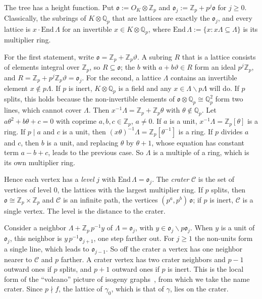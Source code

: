 \documentclass[11pt]{amsart}
\numberwithin{equation}{section}
\theoremstyle{plain}
\theoremstyle{definition}
\theoremstyle{remark}
\begin{document}
The tree has a height function. Put \(\mathfrak o:=O_K\otimes\mathbb Z_p\) and \(\mathfrak o_j:=\mathbb Z_p+p^j\mathfrak o\) for \(j\ge0\). Classically, the subrings of \(K\otimes\mathbb Q_p\) that are lattices are exactly the \(\mathfrak o_j\), and every lattice is \(x\cdot\mathrm{End}\,\Lambda\) for an invertible \(x\in K\otimes\mathbb Q_p\), where \(\mathrm{End}\,\Lambda:=\{x:x\Lambda\subseteq\Lambda\}\) is its multiplier ring.

For the first statement, write \(\mathfrak o=\mathbb Z_p+\mathbb Z_p\vartheta\). A subring \(R\) that is a lattice consists of elements integral over \(\mathbb Z_p\), so \(R\subseteq\mathfrak o\); the \(b\) with \(a+b\vartheta\in R\) form an ideal \(p^j\mathbb Z_p\), and \(R=\mathbb Z_p+p^j\mathbb Z_p\vartheta=\mathfrak o_j\). For the second, a lattice \(\Lambda\) contains an invertible element \(x\notin p\Lambda\). If \(p\) is inert, \(K\otimes\mathbb Q_p\) is a field and any \(x\in\Lambda\smallsetminus p\Lambda\) will do. If \(p\) splits, this holds because the non-invertible elements of \(\mathfrak o\otimes\mathbb Q_p\cong\mathbb Q_p^2\) form two lines, which cannot cover \(\Lambda\). Then \(x^{-1}\Lambda=\mathbb Z_p+\mathbb Z_p\theta\) with \(\theta\notin\mathbb Q_p\). Let \(a\theta^2+b\theta+c=0\) with coprime \(a,b,c\in\mathbb Z_p\), \(a\ne0\). If \(a\) is a unit, \(x^{-1}\Lambda=\mathbb Z_p[\theta]\) is a ring. If \(p\mid a\) and \(c\) is a unit, then \((x\theta)^{-1}\Lambda=\mathbb Z_p[\theta^{-1}]\) is a ring. If \(p\) divides \(a\) and \(c\), then \(b\) is a unit, and replacing \(\theta\) by \(\theta+1\), whose equation has constant term \(a-b+c\), leads to the previous case. So \(\Lambda\) is a multiple of a ring, which is its own multiplier ring.

Hence each vertex has a \emph{level} \(j\) with \(\mathrm{End}\,\Lambda=\mathfrak o_j\). The \emph{crater} \(\mathcal C\) is the set of vertices of level \(0\), the lattices with the largest multiplier ring. If \(p\) splits, then \(\mathfrak o\cong\mathbb Z_p\times\mathbb Z_p\) and \(\mathcal C\) is an infinite path, the vertices \((p^a,p^b)\,\mathfrak o\); if \(p\) is inert, \(\mathcal C\) is a single vertex. The level is the distance to the crater.

Consider a neighbor \(\Lambda+\mathbb Z_p\,p^{-1}y\) of \(\Lambda=\mathfrak o_j\), with \(y\in\mathfrak o_j\smallsetminus p\mathfrak o_j\). When \(y\) is a unit of \(\mathfrak o_j\), this neighbor is \(y\,p^{-1}\mathfrak o_{j+1}\), one step farther out. For \(j\ge1\) the non-units form a single line, which leads to \(\mathfrak o_{j-1}\). So off the crater a vertex has one neighbor nearer to \(\mathcal C\) and \(p\) farther. A crater vertex has two crater neighbors and \(p-1\) outward ones if \(p\) splits, and \(p+1\) outward ones if \(p\) is inert. This is the local form of the ``volcano'' picture of isogeny graphs~\cite{Koh,FM}, from which we take the name crater. Since \(p\nmid f\), the lattice of \(\gamma_0\), which is that of \(\gamma\), lies on the crater.
\end{document}
